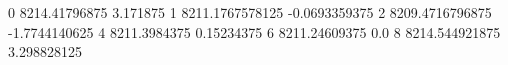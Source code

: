 0 8214.41796875 3.171875
1 8211.1767578125 -0.0693359375
2 8209.4716796875 -1.7744140625
4 8211.3984375 0.15234375
6 8211.24609375 0.0
8 8214.544921875 3.298828125
